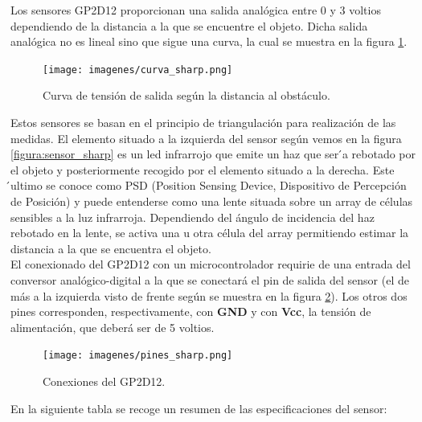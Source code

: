 Los sensores GP2D12 proporcionan una salida analógica entre 0 y 3 voltios dependiendo de la distancia a la que se encuentre el objeto. Dicha salida analógica no es
lineal sino que sigue una curva, la cual se muestra en la figura \ref{figura:curva_sharp}.

 \begin{figure}[H]
  \begin{center}
    \texttt{[image: imagenes/curva\_sharp.png]}
  \end{center}
  \caption{Curva de tensión de salida según la distancia al obstáculo.}
  \label{figura:curva_sharp}
\end{figure}

Estos sensores se basan en el principio de triangulación para realización de las medidas. El elemento situado a la izquierda del sensor según vemos en la figura \ref{figura:sensor_sharp}
es un led infrarrojo que emite un haz que ser ́a rebotado por el objeto y posteriormente recogido por el elemento situado a la derecha. Este ́ultimo se conoce como PSD (Position 
Sensing Device, Dispositivo de Percepción de Posición)  y  puede  entenderse  como  una  lente situada sobre un array de células sensibles a la luz infrarroja. Dependiendo del 
ángulo de incidencia del haz rebotado en la lente, se activa una u otra célula del array permitiendo estimar la distancia a la que se encuentra el objeto.\\

El conexionado del GP2D12 con un microcontrolador requirie de una entrada del conversor analógico-digital a la que se conectará el pin de salida del sensor 
(el de más a la izquierda visto de frente según se muestra en la figura \ref{figura:pines_sharp}). Los otros dos pines corresponden, respectivamente, con \textbf{GND} y con
\textbf{Vcc}, la tensión de alimentación, que deberá ser de 5 voltios.\\

 \begin{figure}[H]
  \begin{center}
    \texttt{[image: imagenes/pines\_sharp.png]}
  \end{center}
  \caption{Conexiones del GP2D12.}
  \label{figura:pines_sharp}
\end{figure}

En la siguiente tabla se recoge un resumen de las especificaciones del sensor:\\


